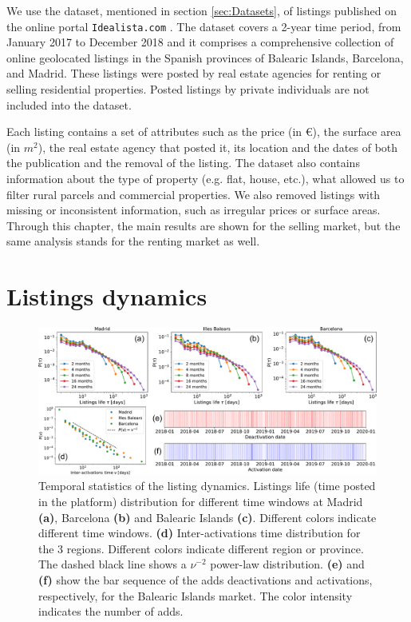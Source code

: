 We use the dataset, mentioned in section \ref{sec:Datasets}, of listings published on the online portal \texttt{Idealista.com} \cite{idealista}. The dataset covers a 2-year time period, from January 2017 to December 2018 and it comprises a comprehensive collection of online geolocated listings in the Spanish provinces of Balearic Islands, Barcelona, and Madrid. These listings were posted by real estate agencies for renting or selling residential properties. Posted listings by private individuals are not included into the dataset.

Each listing contains a set of attributes such as the price (in $\euro$), the surface area (in $m^2$), the real estate agency that posted it, its location and the dates of both the publication and the removal of the listing. The dataset also contains information about the type of property (e.g. flat, house, etc.), what allowed us to filter rural parcels and commercial properties. We also removed listings with missing or inconsistent information, such as irregular prices or surface areas. Through this chapter, the main results are shown for the selling market, but the same analysis stands for the renting market as well.

\section{Listings dynamics}

\begin{figure}
    \centering
    \includegraphics[width =\textwidth]{Figs/Idealista_dynamics/panel_time.pdf}
	\caption[Temporal statistics of the listing dynamics.]{ \label{fig:panel_time} Temporal statistics of the listing dynamics. Listings life (time posted in the platform) distribution for different time windows at Madrid \textbf{(a)}, Barcelona \textbf{(b)} and Balearic Islands \textbf{(c)}. Different colors indicate different time windows. \textbf{(d)} Inter-activations time distribution for the 3 regions. Different colors indicate different region or province. The dashed black line shows a $\nu^{-2}$ power-law distribution. \textbf{(e)} and \textbf{(f)} show the bar sequence of the adds deactivations and activations, respectively, for the Balearic Islands market. The color intensity indicates the number of adds.}
\end{figure}

